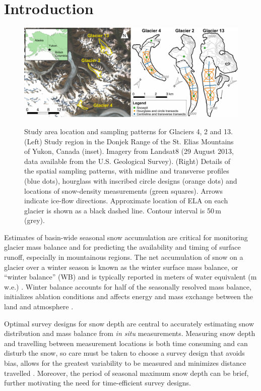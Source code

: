 \documentclass{article}
\begin{document}
\section{Introduction}

\begin{figure}
	\centering
	\includegraphics[width =\textwidth]{Pulwicki_Fig1.pdf}\\
	\caption{Study area location and sampling patterns for Glaciers 4, 2 and 13. (Left) Study region in the Donjek Range of the St. Elias Mountains of Yukon, Canada (inset). Imagery from Landsat8 (29 August 2013, data available from the U.S. Geological Survey). (Right) Details of the spatial sampling patterns, with midline and transverse profiles (blue dots), hourglass with inscribed circle designs (orange dots) and locations of snow-density measurements (green squares). Arrows indicate ice-flow directions. Approximate location of ELA on each glacier is shown as a black dashed line. Contour interval is 50\,m (grey).}
	\label{fig:Sampling}
\end{figure} 

Estimates of basin-wide seasonal snow accumulation are critical for monitoring glacier mass balance and for predicting the availability and timing of surface runoff, especially in mountainous regions. The net accumulation of snow on a glacier over a winter season is known as the winter surface mass balance, or ``winter balance'' (WB) and is typically reported in meters of water equivalent (m\,w.e.) \citep{Cogley2011}. Winter balance accounts for half of the seasonally resolved mass balance, initializes ablation conditions and affects energy and mass exchange between the land and atmosphere \citep[e.g.][]{Hock2005, Reveillet2016}. 

Optimal survey designs for snow depth  are central to accurately estimating snow distribution and mass balance from \textit{in situ} measurements. Measuring snow depth and travelling between measurement locations is both time consuming and can disturb the snow, so care must be taken to choose a survey design that avoids bias, allows for the greatest variability to be measured and minimizes distance travelled \citep[e.g.][]{Shea2010,Kinar2015}. Moreover, the period of seasonal maximum snow depth can be brief, further motivating the need for time-efficient survey designs. 
\end{document}
